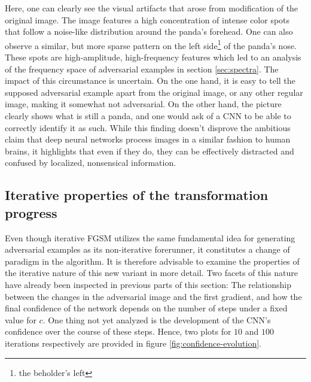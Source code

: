 \documentclass[11pt, a4paper]{article}
\begin{document}
Here, one can clearly see the visual artifacts that arose from modification of the original image. The image features a high concentration of intense color spots that follow a noise-like distribution around the panda's forehead. One can also observe a similar, but more sparse pattern on the left side\footnote{the beholder's left} of the panda's nose. These spots are high-amplitude, high-frequency features which led to an analysis of the frequency space of adversarial examples in section \ref{sec:spectra}. The impact of this circumstance is uncertain. On the one hand, it is easy to tell the supposed adversarial example apart from the original image, or any other regular image, making it somewhat not adversarial. On the other hand, the picture clearly shows what is still a panda, and one would ask of a CNN to be able to correctly identify it as such. While this finding doesn't disprove the ambitious claim that deep neural networks process images in a similar fashion to human brains, it highlights that even if they do, they can be effectively distracted and confused by localized, nonsensical information.


\subsection{Iterative properties of the transformation progress}
\label{subsec:iterative-properties}
Even though iterative FGSM utilizes the same fundamental idea for generating adversarial examples as its non-iterative forerunner, it constitutes a change of paradigm in the algorithm. It is therefore advisable to examine the properties of the iterative nature of this new variant in more detail. Two facets of this nature have already been inspected in previous parts of this section: The relationship between the changes in the adversarial image and the first gradient, and how the final confidence of the network depends on the number of steps under a fixed value for $c$. One thing not yet analyzed is the development of the CNN's confidence over the course of these steps. Hence, two plots for $10$ and $100$ iterations respectively are provided in figure \ref{fig:confidence-evolution}.
\end{document}
